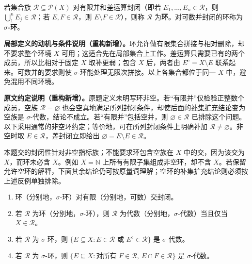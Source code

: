 \documentclass[../../main.tex]{subfiles}%
\begin{document}
\begin{exercise}\label{exercise:ch01-rings}

\begin{definition*}[环与 $\sigma$-环]
若集合族 $\mathscr{R}\subseteq\mathscr{P}(X)$ 对有限并和差运算封闭（即若 $E_1,\ldots,E_n\in\mathscr{R}$，则 $\bigcup_1^nE_j\in\mathscr{R}$；若 $E,F\in\mathscr{R}$，则 $E\setminus F\in\mathscr{R}$），则称 $\mathscr{R}$ 为\textbf{环}。对可数并封闭的环称为 \textbf{$\sigma$-环}。
\end{definition*}
\begin{remark}
\textbf{局部定义的动机与条件说明（重构新增）。}环允许做有限集合拼接与相对删除，却不要求整个环境 $X$ 可用；这适合先在局部集合上工作。差运算只需要已有的两个成员，所以比相对于固定 $X$ 取补更弱；包含 $X$ 后，两者由 $E^{\mathrm c}=X\setminus E$ 联系起来。可数并的要求则使 $\sigma$-环能处理无限次拼接。以上各集合都位于同一 $X$ 中，避免混用不同环境。

\textbf{原文约定说明（重构新增）。}原题定义未明写环非空。若“有限并”仅检验正整数个成员，空族 $\mathscr{R}=\varnothing$ 也会空真地满足所列封闭条件，却使后面的\hyperref[item:ch01-rings-complements]{补集扩充结论}变为空族是 $\sigma$-代数，结论不成立。若“有限并”包括空并，则 $\varnothing\in\mathscr{R}$ 已排除这个问题。以下采用通常的非空环约定；等价地，可在所列封闭条件上明确补加 $\mathscr{R}\ne\varnothing$。非空时取 $E\in\mathscr{R}$，差封闭立即给出 $\varnothing=E\setminus E\in\mathscr{R}$。

本题交的封闭性针对非空指标族；不能要求环包含空族在 $X$ 中的交，因为该交为 $X$，而环未必含 $X$。例如 $X=\mathbb{N}$ 上所有有限子集组成非空环，却不含 $X$。若保留允许空环的解释，下面其余结论仍可按原量词理解；空环的补集扩充结论则必须按上述反例单独排除。
\end{remark}


\begin{enumerate}[label=\alph*.,ref=(\alph*)]
\item\label{item:ch01-rings-intersections} 环（分别地，$\sigma$-环）对有限（分别地，可数）交封闭。
\item\label{item:ch01-rings-algebras} 若 $\mathscr{R}$ 为环（分别地，$\sigma$-环），则 $\mathscr{R}$ 为代数（分别地，$\sigma$-代数）当且仅当 $X\in\mathscr{R}$。
\item\label{item:ch01-rings-complements} 若 $\mathscr{R}$ 为 $\sigma$-环，则 $\{E\subseteq X:E\in\mathscr{R}\text{ 或 }E^{\mathrm{c}}\in\mathscr{R}\}$ 是 $\sigma$-代数。
\item\label{item:ch01-rings-localization} 若 $\mathscr{R}$ 为 $\sigma$-环，则 $\{E\subseteq X:\text{对所有 }F\in\mathscr{R},\ E\cap F\in\mathscr{R}\}$ 是 $\sigma$-代数。
\end{enumerate}
\end{exercise}
\end{document}
